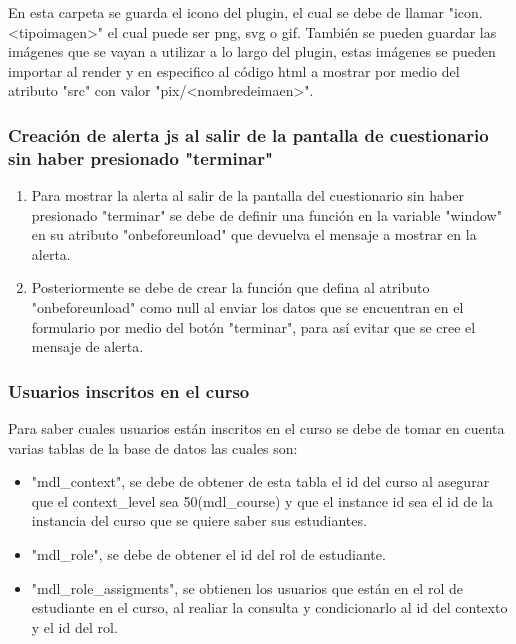 			En esta carpeta se guarda el icono del plugin, el cual se debe de llamar "icon.<tipoimagen>" el cual puede ser png, svg o gif.
			También se pueden guardar las imágenes que se vayan a utilizar a lo largo del plugin, estas imágenes se pueden importar al render y en especifico al código html a mostrar por medio del atributo "src" con valor "pix/<nombredeimaen>".

	\subsubsection{Creación de alerta js al salir de la pantalla de cuestionario sin haber presionado "terminar"}

    \begin{enumerate}
      \item Para mostrar la alerta al salir de la pantalla del cuestionario sin haber presionado "terminar" se debe de definir una función en la variable "window" en su atributo "onbeforeunload" que devuelva el mensaje a mostrar en la alerta.
      \item Posteriormente se debe de crear la función que defina al atributo "onbeforeunload" como null al enviar los datos que se encuentran en el formulario por medio del botón "terminar", para así evitar que se cree el mensaje de alerta.
    \end{enumerate}


  \subsubsection{Usuarios inscritos en el curso}
		Para saber cuales usuarios están inscritos en el curso se debe de tomar en cuenta varias tablas de la base de datos las cuales son:
    \begin{itemize}
      \item "mdl\_context", se debe de obtener de esta tabla el id del curso al asegurar que el context\_level sea 50(mdl\_course) y que el instance id sea el id de la instancia del curso que se quiere saber sus estudiantes.
      \item "mdl\_role", se debe de obtener el id del rol de estudiante.
      \item "mdl\_role\_assigments", se obtienen los usuarios que están en el rol de estudiante en el curso, al realiar la consulta y condicionarlo al id del contexto y el id del rol.
    \end{itemize}

